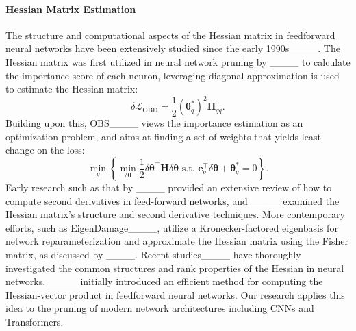 \paragraph{Hessian Matrix Estimation} The structure and computational aspects of the Hessian matrix in feedforward neural networks have been extensively studied since the early 1990s____. The Hessian matrix was first utilized in neural network pruning by ____ to calculate the importance score of each neuron, leveraging diagonal approximation is used to estimate the Hessian matrix:
\begin{equation}
\delta \mathcal{L}_{\mathrm{OBD}}=\frac{1}{2}\left(\boldsymbol{\theta}_q^*\right)^2 \mathbf{H}_{q q}.
\end{equation}
Building upon this, OBS____ views the importance estimation as an optimization problem, and aims at finding a set of weights that yields least change on the loss:
\begin{equation}
    \min _q\left\{\min _{\delta \boldsymbol{\theta}} \frac{1}{2} \delta \boldsymbol{\theta}^{\top} \mathbf{H} \delta \boldsymbol{\theta} \text { s.t. } \mathbf{e}_q^{\top} \delta \boldsymbol{\theta}+\boldsymbol{\theta}_q^*=0\right\}.
    \end{equation}
Early research such as that by ____ provided an extensive review of how to compute second derivatives in feed-forward networks, and ____ examined the Hessian matrix's structure and second derivative techniques. More contemporary efforts, such as EigenDamage____, utilize a Kronecker-factored eigenbasis for network reparameterization and approximate the Hessian matrix using the Fisher matrix, as discussed by ____. Recent studies____ have thoroughly investigated the common structures and rank properties of the Hessian in neural networks. ____ initially introduced an efficient method for computing the Hessian-vector product in feedforward neural networks. Our research applies this idea to the pruning of modern network architectures including CNNs and Transformers.

\vspace{-0.1cm}
